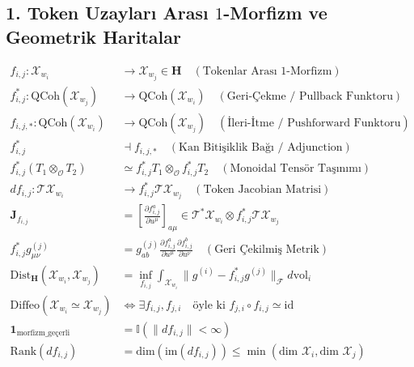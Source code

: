 \documentclass[11pt, a4paper]{article}
\begin{document}
\subsection{1. Token Uzayları Arası $1$-Morfizm ve Geometrik Haritalar}
\begin{align}
f_{i,j} : \mathcal{X}_{w_i} &\longrightarrow \mathcal{X}_{w_j} \in \mathbf{H} \quad (\text{Tokenlar Arası $1$-Morfizm}) \\
f_{i,j}^* : \text{QCoh}(\mathcal{X}_{w_j}) &\longrightarrow \text{QCoh}(\mathcal{X}_{w_i}) \quad (\text{Geri-Çekme / Pullback Funktoru}) \\
f_{i,j, *} : \text{QCoh}(\mathcal{X}_{w_i}) &\longrightarrow \text{QCoh}(\mathcal{X}_{w_j}) \quad (\text{İleri-İtme / Pushforward Funktoru}) \\
f_{i,j}^* &\dashv f_{i,j, *} \quad (\text{Kan Bitişiklik Bağı / Adjunction}) \\
f_{i,j}^*(T_1 \otimes_{\mathcal{O}} T_2) &\simeq f_{i,j}^* T_1 \otimes_{\mathcal{O}} f_{i,j}^* T_2 \quad (\text{Monoidal Tensör Taşınımı}) \\
df_{i,j} : \mathcal{T}\mathcal{X}_{w_i} &\longrightarrow f_{i,j}^* \mathcal{T}\mathcal{X}_{w_j} \quad (\text{Token Jacobian Matrisi}) \\
\mathbf{J}_{f_{i,j}} &= \left[ \frac{\partial f_{i,j}^a}{\partial u^\mu} \right]_{a\mu} \in \mathcal{T}^*\mathcal{X}_{w_i} \otimes f_{i,j}^* \mathcal{T}\mathcal{X}_{w_j} \\
f_{i,j}^* g_{\mu\nu}^{(j)} &= g_{ab}^{(j)} \frac{\partial f_{i,j}^a}{\partial u^\mu} \frac{\partial f_{i,j}^b}{\partial u^\nu} \quad (\text{Geri Çekilmiş Metrik}) \\
\text{Dist}_{\mathbf{H}}(\mathcal{X}_{w_i}, \mathcal{X}_{w_j}) &= \inf_{f_{i,j}} \int_{\mathcal{X}_{w_i}} \|g^{(i)} - f_{i,j}^* g^{(j)}\|_{\mathcal{F}} d\text{vol}_i \\
\text{Diffeo}(\mathcal{X}_{w_i} \simeq \mathcal{X}_{w_j}) &\iff \exists f_{i,j}, f_{j,i} \quad \text{öyle ki } f_{j,i} \circ f_{i,j} \simeq \text{id} \\
\mathbf{1}_{\text{morfizm\_geçerli}} &= \mathbb{I}\left( \|df_{i,j}\| < \infty \right) \\
\text{Rank}(df_{i,j}) &= \text{dim}(\text{im}(df_{i,j})) \le \min(\text{dim } \mathcal{X}_i, \text{dim } \mathcal{X}_j)
\end{align}
\end{document}
